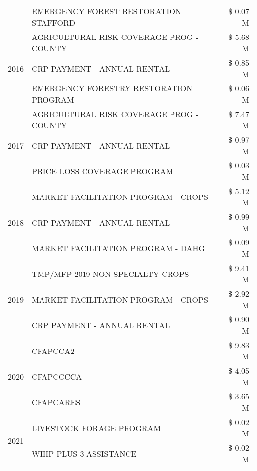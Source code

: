 \begin{tabular}{llr}
 & EMERGENCY FOREST RESTORATION STAFFORD & \$ 0.07 M \\
\cline{1-3}
\multirow[t]{3}{*}{2016} & AGRICULTURAL RISK COVERAGE PROG - COUNTY & \$ 5.68 M \\
 & CRP PAYMENT - ANNUAL RENTAL & \$ 0.85 M \\
 & EMERGENCY FORESTRY RESTORATION PROGRAM & \$ 0.06 M \\
\cline{1-3}
\multirow[t]{3}{*}{2017} & AGRICULTURAL RISK COVERAGE PROG - COUNTY & \$ 7.47 M \\
 & CRP PAYMENT - ANNUAL RENTAL & \$ 0.97 M \\
 & PRICE LOSS COVERAGE PROGRAM & \$ 0.03 M \\
\cline{1-3}
\multirow[t]{3}{*}{2018} & MARKET FACILITATION PROGRAM - CROPS & \$ 5.12 M \\
 & CRP PAYMENT - ANNUAL RENTAL & \$ 0.99 M \\
 & MARKET FACILITATION PROGRAM - DAHG & \$ 0.09 M \\
\cline{1-3}
\multirow[t]{3}{*}{2019} & TMP/MFP 2019 NON SPECIALTY CROPS & \$ 9.41 M \\
 & MARKET FACILITATION PROGRAM - CROPS & \$ 2.92 M \\
 & CRP PAYMENT - ANNUAL RENTAL & \$ 0.90 M \\
\cline{1-3}
\multirow[t]{3}{*}{2020} & CFAPCCA2 & \$ 9.83 M \\
 & CFAPCCCCA & \$ 4.05 M \\
 & CFAPCARES & \$ 3.65 M \\
\cline{1-3}
\multirow[t]{2}{*}{2021} & LIVESTOCK FORAGE PROGRAM & \$ 0.02 M \\
 & WHIP PLUS 3 ASSISTANCE & \$ 0.02 M \\
\cline{1-3}
\bottomrule
\end{tabular}
